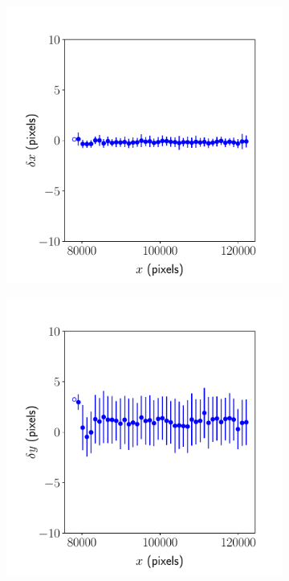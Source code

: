 \documentclass{article}
\begin{document}
\begin{figure}[ht]
	\centering
	\begin{subfigure}{0.24\linewidth}
		\includegraphics[width=\linewidth]{sine-wave-2-xx-1.pdf}
		\caption{}
		\label{fig:sinewave2xx1}
	\end{subfigure}
	\begin{subfigure}{0.24\linewidth}
		\includegraphics[width=\linewidth]{sine-wave-2-yx-1.pdf}

\end{subfigure}
\end{figure}
\end{document}
